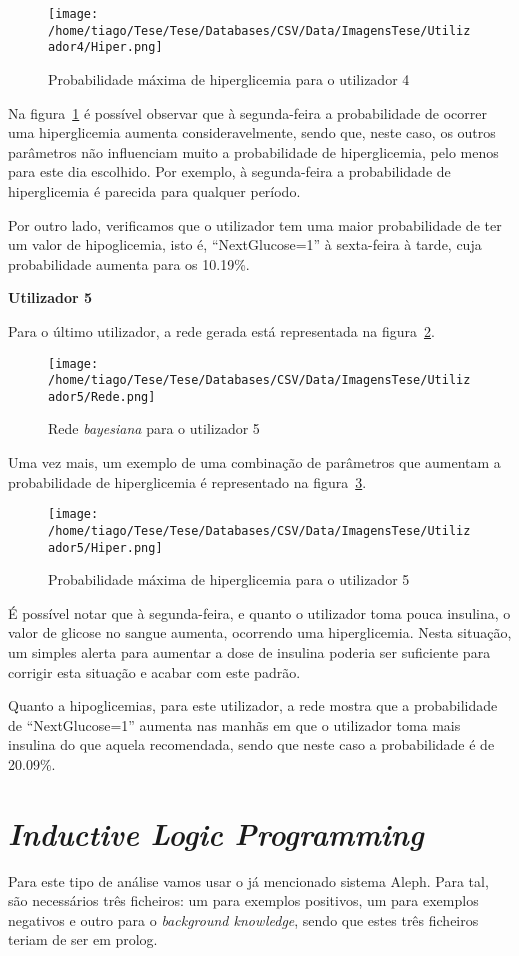 \begin{figure}[H]
\centering
\texttt{[image: /home/tiago/Tese/Tese/Databases/CSV/Data/ImagensTese/Utilizador4/Hiper.png]}
\caption{Probabilidade máxima de hiperglicemia para o utilizador 4}
\label{fig:hiper4}
\end{figure}
Na figura~\ref{fig:hiper4} é possível observar que à segunda-feira a probabilidade de ocorrer uma hiperglicemia aumenta consideravelmente, sendo que, neste caso, os outros parâmetros não influenciam muito a probabilidade de hiperglicemia, pelo menos para este dia escolhido. Por exemplo, à segunda-feira a probabilidade de hiperglicemia é parecida para qualquer período.

Por outro lado, verificamos que o utilizador tem uma maior probabilidade de ter um valor de hipoglicemia, isto é, ``Next\textunderscore Glucose=1'' à sexta-feira à tarde, cuja probabilidade aumenta para os 10.19\%.


\textbf{Utilizador 5}


Para o último utilizador, a rede gerada está representada na figura~\ref{fig:sam5}.

\begin{figure}[H]
\centering
\texttt{[image: /home/tiago/Tese/Tese/Databases/CSV/Data/ImagensTese/Utilizador5/Rede.png]}
\caption{Rede \textit{bayesiana} para o utilizador 5}
\label{fig:sam5}
\end{figure}
Uma vez mais, um exemplo de uma combinação de parâmetros que aumentam a probabilidade de hiperglicemia é representado na figura~\ref{fig:hiper5}.

\begin{figure}[H]
\centering
\texttt{[image: /home/tiago/Tese/Tese/Databases/CSV/Data/ImagensTese/Utilizador5/Hiper.png]}
\caption{Probabilidade máxima de hiperglicemia para o utilizador 5}
\label{fig:hiper5}
\end{figure}
É possível notar que à segunda-feira, e quanto o utilizador toma pouca insulina, o valor de glicose no sangue aumenta, ocorrendo uma hiperglicemia. Nesta situação, um simples alerta para aumentar a dose de insulina poderia ser suficiente para corrigir esta situação e acabar com este padrão.

Quanto a hipoglicemias, para este utilizador, a rede mostra que a probabilidade de ``Next\textunderscore Glucose=1'' aumenta nas manhãs em que o utilizador toma mais insulina do que aquela recomendada, sendo que neste caso a probabilidade é de 20.09\%.


\section{\textit{Inductive Logic Programming}}

Para este tipo de análise vamos usar o já mencionado sistema Aleph. Para tal, são necessários três ficheiros: um para exemplos positivos, um para exemplos negativos e outro para o \textit{background knowledge}, sendo que estes três ficheiros teriam de ser em prolog. 
